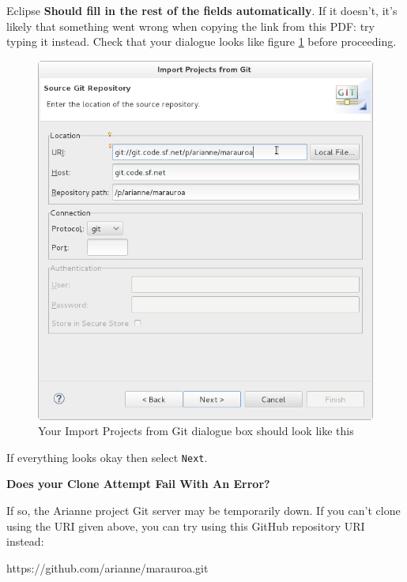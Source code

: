 \documentclass[
]{book}
\newenvironment{Shaded}{\begin{snugshade}}{\end{snugshade}}
\newcommand{\NormalTok}[1]{#1}
\begin{document}
Eclipse \textbf{Should fill in the rest of the fields automatically}. If it doesn't, it's likely that something went wrong when copying the link from this PDF: try typing it instead. Check that your dialogue looks like figure \ref{fig:enterMarauroaURI-fig} before proceeding.

\begin{figure}

{\centering \includegraphics[width=1\linewidth]{images/1.4enterMarauroaURI} 

}

\caption{Your Import Projects from Git dialogue box should look like this}\label{fig:enterMarauroaURI-fig}
\end{figure}

If everything looks okay then select \texttt{Next}.

\textbf{Does your Clone Attempt Fail With An Error?}

If so, the Arianne project Git server may be temporarily down. If you can't clone using the URI given above, you can try using this GitHub repository URI instead:

\begin{Shaded}
\begin{Highlighting}[]
\NormalTok{https://github.com/arianne/marauroa.git}
\end{Highlighting}
\end{Shaded}
\end{document}
